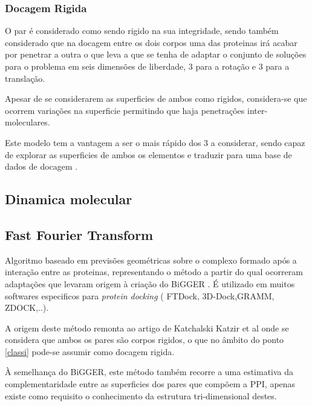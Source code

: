 	\subsubsection{Docagem Rigida} 
	O par é considerado como sendo rigido na sua integridade, sendo também considerado que na docagem entre os dois corpos uma das proteinas irá acabar por penetrar a outra o que leva a que se tenha de adaptar o conjunto de soluções para o problema em seis 		dimensões de liberdade, 3 para a rotação e 3 para a translação. %

Apesar de se considerarem as superficies de ambos como rigidos, considera-se que ocorrem variações na superficie permitindo que haja penetrações inter-moleculares.

Este modelo tem a vantagem a ser o mais rápido dos 3 a considerar, sendo capaz de explorar as superficies de ambos os elementos e traduzir para uma base de dados de docagem \cite{halperin}.


\subsection{Dinamica molecular}



\subsection{Fast Fourier Transform}
Algoritmo baseado em previsões geométricas sobre o complexo formado após a interação entre as proteinas, representando o método a partir do qual ocorreram adaptações que levaram origem à criação do BiGGER \cite{biggerPaper}.
É utilizado em muitos softwares especificos para \textit{protein docking} ( FTDock, 3D-Dock,GRAMM, ZDOCK,..)\cite{geometry}. 

A origem deste método remonta ao artigo de Katchalski Katzir et al \cite{katchalski1992} onde se considera que ambos os pares são corpos rigidos, o que no âmbito do ponto \ref{classi} pode-se assumir como docagem rigida. 

 À semelhança do BiGGER, este método também recorre a uma estimativa da complementaridade entre as superficies dos pares que compõem a PPI, apenas existe como requisito o conhecimento da estrutura tri-dimensional destes.
 
